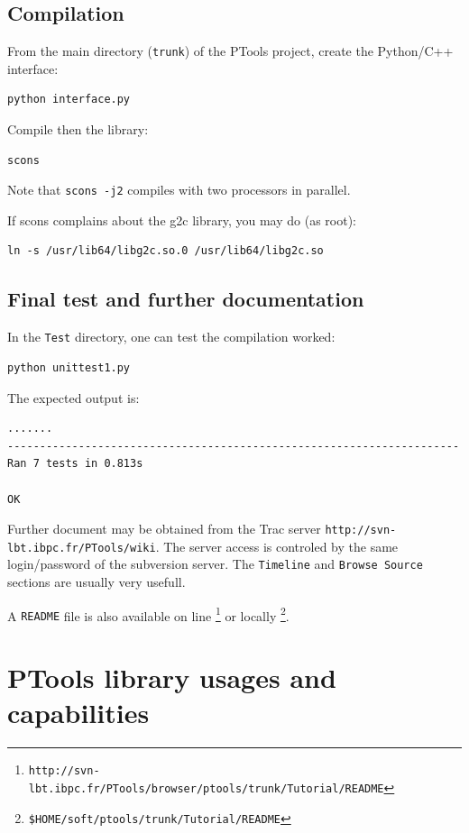 \documentclass[12pt,a4paper]{article}
\begin{document}
\subsection{Compilation}
From the main directory ({\tt trunk}) of the PTools project, create the Python/C++ interface:
\begin{verbatim}
python interface.py
\end{verbatim}

Compile then the library:
\begin{verbatim}
scons
\end{verbatim}

Note that {\tt scons -j2} compiles with two processors in parallel.

If scons complains about the g2c library, you may do (as root):
\begin{verbatim}
ln -s /usr/lib64/libg2c.so.0 /usr/lib64/libg2c.so
\end{verbatim}

\subsection{Final test and further documentation}

In the {\tt Test} directory, one can test the compilation worked:
\begin{verbatim}
python unittest1.py
\end{verbatim}

The expected output is:
\begin{verbatim}
....... 
---------------------------------------------------------------------- 
Ran 7 tests in 0.813s 

OK 
\end{verbatim}

Further document may be obtained from the Trac server {\tt http://svn-lbt.ibpc.fr/PTools/wiki}. 
The server access is controled by the same login/password of the subversion server. The {\tt Timeline}
and {\tt Browse Source} sections are usually very usefull.

A {\tt README} file is also available on line 
\footnote{\tt http://svn-lbt.ibpc.fr/PTools/browser/ptools/trunk/Tutorial/README} 
or locally \footnote{\tt \$HOME/soft/ptools/trunk/Tutorial/README}.


\section{PTools library usages and capabilities}
\end{document}
